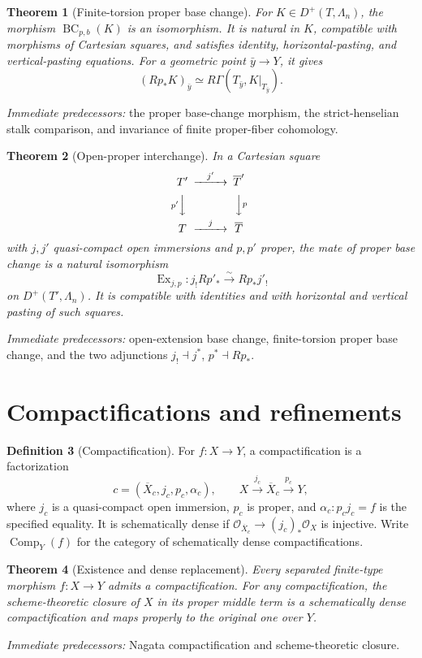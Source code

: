 \documentclass[10pt]{article}
\newtheorem{theorem}{Theorem}[section]
\theoremstyle{definition}
\newtheorem{definition}[theorem]{Definition}
\newcommand{\Comp}{\operatorname{Comp}}
\newcommand{\pred}[1]{\par\smallskip\begingroup\footnotesize\raggedright
\emph{Immediate predecessors:} #1.\par\endgroup}
\begin{document}
\begin{theorem}[Finite-torsion proper base change]
For \(K\in D^+(T,\Lambda_n)\), the morphism
\(\operatorname{BC}_{p,b}(K)\) is an isomorphism.  It is natural in \(K\),
compatible with morphisms of Cartesian squares, and satisfies identity,
horizontal-pasting, and vertical-pasting equations.  For a geometric point
\(\bar y\to Y\), it gives
\[
 (Rp_*K)_{\bar y}\simeq
 R\Gamma(T_{\bar y},K|_{T_{\bar y}}).
\]
\end{theorem}
\pred{the proper base-change morphism, the strict-henselian stalk comparison, and invariance of finite proper-fiber cohomology}

\begin{theorem}[Open-proper interchange]
In a Cartesian square
\[
\begin{CD}
 T'@>{j'}>>\overline T'\\
 @V{p'}VV @VV{p}V\\
 T@>{j}>>\overline T
\end{CD}
\]
with \(j,j'\) quasi-compact open immersions and \(p,p'\) proper, the mate of
proper base change is a natural isomorphism
\[
 \operatorname{Ex}_{j,p}:j_!Rp'_*\xrightarrow{\sim}Rp_*j'_!
\]
on \(D^+(T',\Lambda_n)\).  It is compatible with identities and with
horizontal and vertical pasting of such squares.
\end{theorem}
\pred{open-extension base change, finite-torsion proper base change, and the two adjunctions \(j_!\dashv j^*\), \(p^*\dashv Rp_*\)}

\section{Compactifications and refinements}

\begin{definition}[Compactification]
For \(f:X\to Y\), a compactification is a factorization
\[
 c=(\overline X_c,j_c,p_c,\alpha_c),\qquad
 X\xrightarrow{j_c}\overline X_c\xrightarrow{p_c}Y,
\]
where \(j_c\) is a quasi-compact open immersion, \(p_c\) is proper, and
\(\alpha_c:p_cj_c=f\) is the specified equality.  It is schematically
dense if \(\mathcal O_{\overline X_c}\to(j_c)_*\mathcal O_X\) is injective.
Write \(\Comp_Y(f)\) for the category of schematically dense
compactifications.
\end{definition}

\begin{theorem}[Existence and dense replacement]
Every separated finite-type morphism \(f:X\to Y\) admits a compactification.
For any compactification, the scheme-theoretic closure of \(X\) in its
proper middle term is a schematically dense compactification and maps
properly to the original one over \(Y\).
\end{theorem}
\pred{Nagata compactification and scheme-theoretic closure}
\end{document}
